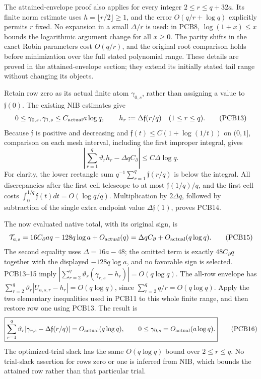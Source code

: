\documentclass[11pt,a4paper]{article}
\begin{document}
The attained-envelope proof also applies for every integer
$2\le r\le q+32a$. Its finite norm estimate uses
$h=\lfloor r/2\rfloor\ge1$, and the error $O(q/r+\log q)$ explicitly
permits $r$ fixed. No expansion in a small $\Delta/r$ is used: in PCB8,
$\log(1+x)\le x$ bounds the logarithmic argument change for all $x\ge0$.
The parity shifts in the exact Robin parameters cost $O(q/r)$, and the
original root comparison holds before minimization over the full stated
polynomial range. These details are proved in the attained-envelope
section; they extend its initially stated tail range without changing its
objects.

Retain row zero as its actual finite atom $\gamma_{0,s}$, rather than
assigning a value to $\mathfrak f(0)$. The existing NIB estimates give
\[
 0\le\gamma_{0,s},\gamma_{1,s}
       \le C_{\rm actual}a\log q,
 \qquad h_r:=\Delta\mathfrak f(r/q)\quad(1\le r\le q).
 \tag{PCB13}
\]
Because $\mathfrak f$ is positive and decreasing and
$\mathfrak f(t)\le C(1+\log(1/t))$ on $(0,1]$, comparison on each mesh
interval, including the first improper integral, gives
\[
 \left|\sum_{r=1}^{q}\vartheta_rh_r-\Delta qC_\partial\right|
       \le C\Delta\log q.
 \tag{PCB14}
\]
For clarity, the lower rectangle sum $q^{-1}\sum_{r=1}^q\mathfrak f(r/q)$
is below the integral. All discrepancies after the first cell telescope
to at most $\mathfrak f(1/q)/q$, and the first cell costs
$\int_0^{1/q}\mathfrak f(t)dt=O(\log q/q)$.
Multiplication by $2\Delta q$, followed by subtraction of the single
extra endpoint value $\Delta\mathfrak f(1)$, proves PCB14.

The now evaluated native total, with its original sign, is
\[
 \mathcal T_{a,s}=16C_\partial aq-128q\log a+O_{\rm actual}(q)
       =\Delta qC_\partial+O_{\rm actual}(q\log q).
 \tag{PCB15}
\]
The second equality uses $\Delta=16a-48$; the omitted term is exactly
$48C_\partial q$ together with the displayed $-128q\log a$, and no
favorable sign is selected. PCB13--15 imply
$|\sum_{r=2}^q\vartheta_r(\gamma_{r,s}-h_r)|=O(q\log q)$.
The all-row envelope has
$\sum_{r=2}^q\vartheta_r|U_{a,s,r}-h_r|=O(q\log q)$, since
$\sum_{r=2}^q q/r=O(q\log q)$.
Apply the two elementary inequalities used in PCB11 to this whole finite
range, and then restore row one using PCB13. The result is
\[
 \boxed{\sum_{r=1}^q\vartheta_r
        |\gamma_{r,s}-\Delta\mathfrak f(r/q)|
          =O_{\rm actual}(q\log q),\qquad
 0\le\gamma_{0,s}=O_{\rm actual}(a\log q).}
 \tag{PCB16}
\]
The optimized-trial slack has the same $O(q\log q)$ bound over
$2\le r\le q$. No trial-slack assertion for rows zero or one is inferred
from NIB, which bounds the attained row rather than that particular trial.
\end{document}
